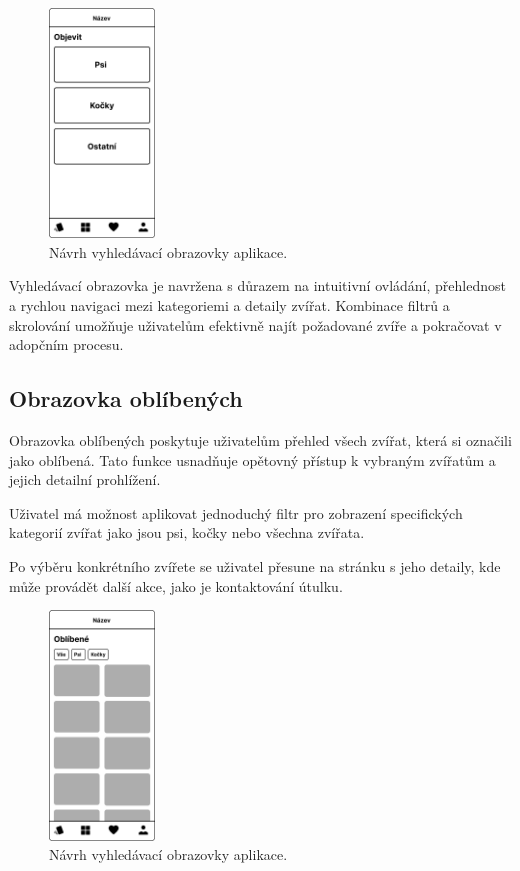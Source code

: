 \documentclass[12pt,a4paper]{report}
\begin{document}
\begin{figure}[h!]
    \centering
    \includegraphics[width=0.25\textwidth]{img/explore.png}
    \caption{Návrh vyhledávací obrazovky aplikace.}
    \label{fig:explore_screen}
\end{figure}

Vyhledávací obrazovka je navržena s důrazem na intuitivní ovládání, přehlednost a rychlou navigaci mezi kategoriemi a detaily zvířat. Kombinace filtrů a skrolování umožňuje uživatelům efektivně najít požadované zvíře a pokračovat v adopčním procesu.

\subsection{Obrazovka oblíbených}

Obrazovka oblíbených poskytuje uživatelům přehled všech zvířat, která si označili jako oblíbená. Tato funkce usnadňuje opětovný přístup k vybraným zvířatům a jejich detailní prohlížení. 

Uživatel má možnost aplikovat jednoduchý filtr pro zobrazení specifických kategorií zvířat jako jsou psi, kočky nebo všechna zvířata.

Po výběru konkrétního zvířete se uživatel přesune na stránku s jeho detaily, kde může provádět další akce, jako je kontaktování útulku.

\begin{figure}[h!]
    \centering
    \includegraphics[width=0.25\textwidth]{img/like.png}
    \caption{Návrh vyhledávací obrazovky aplikace.}
    \label{fig:match_screen}
\end{figure}
\end{document}
